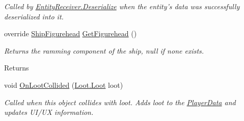 \begin{DoxyCompactItemize}
\begin{DoxyCompactList}\small\item\em Called by \hyperlink{class_skyrates_1_1_common_1_1_entity_1_1_entity_receiver_a9da0b7c3a8b9e1ed7d10be74ce80482b}{Entity\-Receiver.\-Deserialize} when the entity's data was successfully deserialized into it.  \end{DoxyCompactList}\item 
\hypertarget{class_skyrates_1_1_client_1_1_entity_1_1_entity_player_ship_ae82ff64089a164c1554405f636ca5d1c}{override \hyperlink{class_skyrates_1_1_client_1_1_ship_1_1_ship_figurehead}{Ship\-Figurehead} \hyperlink{class_skyrates_1_1_client_1_1_entity_1_1_entity_player_ship_ae82ff64089a164c1554405f636ca5d1c}{Get\-Figurehead} ()}\label{class_skyrates_1_1_client_1_1_entity_1_1_entity_player_ship_ae82ff64089a164c1554405f636ca5d1c}

\begin{DoxyCompactList}\small\item\em Returns the ramming component of the ship, null if none exists. 

\begin{DoxyReturn}{Returns}

\end{DoxyReturn}
 \end{DoxyCompactList}\item 
void \hyperlink{class_skyrates_1_1_client_1_1_entity_1_1_entity_player_ship_a276f68d1ca868650ce0cfa6cd1e53a10}{On\-Loot\-Collided} (\hyperlink{class_skyrates_1_1_client_1_1_loot_1_1_loot}{Loot.\-Loot} loot)
\begin{DoxyCompactList}\small\item\em Called when this object collides with loot. Adds loot to the \hyperlink{class_skyrates_1_1_client_1_1_entity_1_1_entity_player_ship_a775f40dd5d6c89a50325eaa9dbd605b8}{Player\-Data} and updates U\-I/\-U\-X information. \end{DoxyCompactList}\end{DoxyCompactItemize}
